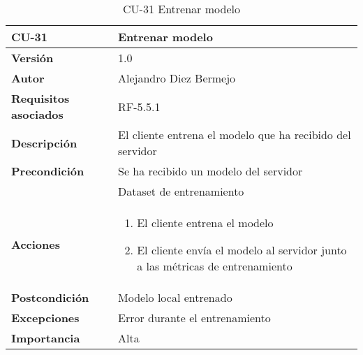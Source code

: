\begin{table}[p]
	\centering
	\begin{tabularx}{\linewidth}{ p{} p{} }
		\toprule
		\textbf{CU-31}    & \textbf{Entrenar modelo}\\
		\toprule
		\textbf{Versión}              & 1.0    \\
		\textbf{Autor}                & Alejandro Diez Bermejo \\
		\textbf{Requisitos asociados} & RF-5.5.1 \\
		\textbf{Descripción}          & El cliente entrena el modelo que ha recibido del servidor \\
        \textbf{Precondición}         & Se ha recibido un modelo del servidor \\
                                      & Dataset de entrenamiento \\
		\textbf{Acciones}             &
		\begin{enumerate}
			\def\labelenumi{\arabic{enumi}.}
			\tightlist
            \item El cliente entrena el modelo
            \item El cliente envía el modelo al servidor junto a las métricas de entrenamiento
		\end{enumerate}\\
		\textbf{Postcondición}        & Modelo local entrenado \\
		\textbf{Excepciones}          & Error durante el entrenamiento \\
		\textbf{Importancia}          & Alta \\
		\bottomrule
	\end{tabularx}
	\caption{CU-31 Entrenar modelo}
\end{table}

